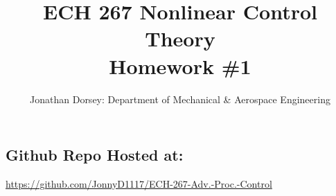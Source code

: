 \documentclass[12px]{article}
\begin{document}
    \title{ECH 267 Nonlinear Control Theory \\ Homework \#1  }

    \author{Jonathan Dorsey: Department of Mechanical \& Aerospace Engineering}


    \maketitle


    \begin{center}
        \section*{Github Repo Hosted at: }
        \url{https://github.com/JonnyD1117/ECH-267-Adv.-Proc.-Control}
    \end{center}


























\end{document}
